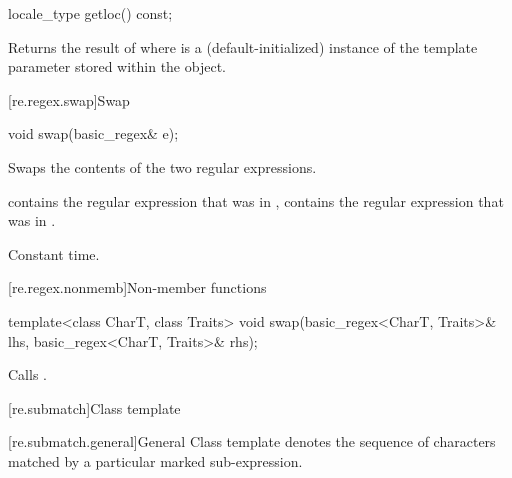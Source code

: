 %
\begin{itemdecl}
locale_type getloc() const;
\end{itemdecl}

\begin{itemdescr}
\pnum
\effects
Returns the result of  where
 is a (default-initialized) instance of the template
parameter  stored within the object.
\end{itemdescr}

[re.regex.swap]{Swap}
%

%
\begin{itemdecl}
void swap(basic_regex& e);
\end{itemdecl}

\begin{itemdescr}
\pnum
\effects
Swaps the contents of the two regular expressions.

\pnum
\ensures
{} contains the regular expression
that was in ,  contains the regular expression that
was in .

\pnum
\complexity
Constant time.
\end{itemdescr}

[re.regex.nonmemb]{Non-member functions}

%
\begin{itemdecl}
template<class CharT, class Traits>
  void swap(basic_regex<CharT, Traits>& lhs, basic_regex<CharT, Traits>& rhs);
\end{itemdecl}

\begin{itemdescr}
\pnum
\effects
Calls .
\end{itemdescr}

[re.submatch]{Class template }

[re.submatch.general]{General}
\pnum
{}%
Class template  denotes the sequence of characters matched
by a particular marked sub-expression.

